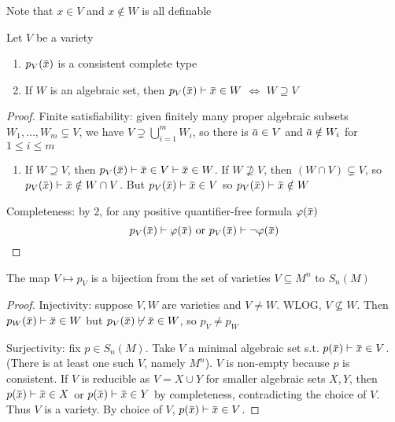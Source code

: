 \documentclass[11pt]{article}
\begin{document}
Note that \(x\in V\) and \(x\notin W\) is all definable

\begin{proposition}[]
Let \(V\) be a variety
\begin{enumerate}
\item \(p_V(\barx)\) is a consistent complete type
\item If \(W\) is an algebraic set, then \(p_V(\barx)\vdash\barx\in W\) \(\Leftrightarrow\) \(W\supseteq V\)
\end{enumerate}
\end{proposition}

\begin{proof}
Finite satisfiability: given finitely many proper algebraic subsets \(W_1,\dots,W_m\subsetneq V\), we
have \(V\supsetneq\bigcup_{i=1}^mW_i\), so there is \(\bara\in V\) and \(\bara\notin W_i\) for \(1\le i\le m\)

\begin{enumerate}
\item If \(W\supseteq V\), then \(p_V(\barx)\vdash\barx\in V\vdash\barx\in W\). If \(W\not\supseteq V\),
then \((W\cap V)\subsetneq V\), so \(p_V(\barx)\vdash\barx\notin W\cap V\). But \(p_V(\barx)\vdash\barx\in V\)
so \(p_V(\barx)\vdash\barx\notin W\)
\end{enumerate}


Completeness: by 2, for any positive quantifier-free formula \(\varphi(\barx)\)
\begin{equation*}
p_V(\barx)\vdash\varphi(\barx)\text{ or }p_V(\barx)\vdash\neg\varphi(\barx)
\end{equation*}
\end{proof}

\begin{theorem}[]
The map \(V\mapsto p_V\) is a bijection from the set of varieties \(V\subseteq M^n\) to \(S_n(M)\)
\end{theorem}

\begin{proof}
Injectivity: suppose \(V,W\) are varieties and \(V\neq W\). WLOG, \(V\not\subseteq W\).
Then \(p_W(\barx)\vdash \barx\in W\) but \(p_V(\barx)\not\vdash\barx\in W\), so \(p_V\neq p_W\)

Surjectivity: fix \(p\in S_n(M)\). Take \(V\) a minimal algebraic set s.t. \(p(\barx)\vdash\barx\in V\).
(There is at least one such \(V\), namely \(M^n\)). \(V\) is non-empty because \(p\) is
consistent. If \(V\) is reducible as \(V=X\cup Y\) for smaller algebraic sets \(X,Y\),
then \(p(\barx)\vdash\barx\in X\) or \(p(\barx)\vdash\barx\in Y\) by completeness, contradicting the choice
of \(V\). Thus \(V\) is a variety. By choice of \(V\), \(p(\barx)\vdash\barx\in V\).
\end{proof}
\end{document}
